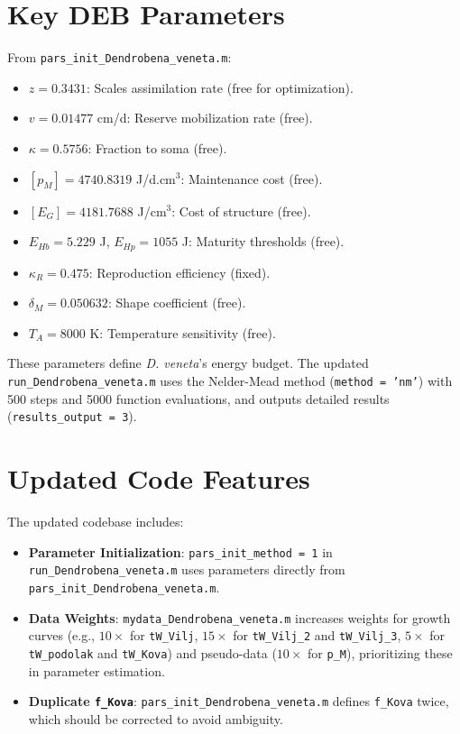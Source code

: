 \documentclass[11pt]{article}
\begin{document}
\section{Key DEB Parameters}
From \texttt{pars\_init\_Dendrobena\_veneta.m}:
\begin{itemize}
    \item $z = 0.3431$: Scales assimilation rate (free for optimization).
    \item $v = 0.01477$ cm/d: Reserve mobilization rate (free).
    \item $\kappa = 0.5756$: Fraction to soma (free).
    \item $[p_M] = 4740.8319$ J/d.cm$^3$: Maintenance cost (free).
    \item $[E_G] = 4181.7688$ J/cm$^3$: Cost of structure (free).
    \item $E_{Hb} = 5.229$ J, $E_{Hp} = 1055$ J: Maturity thresholds (free).
    \item $\kappa_R = 0.475$: Reproduction efficiency (fixed).
    \item $\delta_M = 0.050632$: Shape coefficient (free).
    \item $T_A = 8000$ K: Temperature sensitivity (free).
\end{itemize}
These parameters define \textit{D. veneta}’s energy budget. The updated \texttt{run\_Dendrobena\_veneta.m} uses the Nelder-Mead method (\texttt{method = 'nm'}) with 500 steps and 5000 function evaluations, and outputs detailed results (\texttt{results\_output = 3}).

\section{Updated Code Features}
The updated codebase includes:
\begin{itemize}
    \item \textbf{Parameter Initialization}: \texttt{pars\_init\_method = 1} in \texttt{run\_Dendrobena\_veneta.m} uses parameters directly from \texttt{pars\_init\_Dendrobena\_veneta.m}.
    \item \textbf{Data Weights}: \texttt{mydata\_Dendrobena\_veneta.m} increases weights for growth curves (e.g., $10\times$ for \texttt{tW\_Vilj}, $15\times$ for \texttt{tW\_Vilj\_2} and \texttt{tW\_Vilj\_3}, $5\times$ for \texttt{tW\_podolak} and \texttt{tW\_Kova}) and pseudo-data ($10\times$ for \texttt{p\_M}), prioritizing these in parameter estimation.
    \item \textbf{Duplicate \texttt{f\_Kova}}: \texttt{pars\_init\_Dendrobena\_veneta.m} defines \texttt{f\_Kova} twice, which should be corrected to avoid ambiguity.
\end{itemize}
\end{document}
